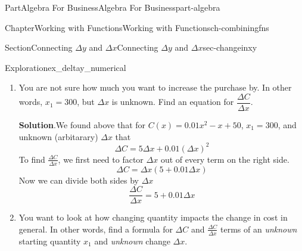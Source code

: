\documentclass{tufte-book}
\newcommand{\blocktitlefont}{\relax}
\numberwithin{equation}{chapter}
\newcommand{\amp}{&}
\begin{document}
\begin{partptx}{Part}{Algebra For Business}{}{Algebra For Business}{}{}{part-algebra}
\begin{chapterptx}{Chapter}{Working with Functions}{}{Working with Functions}{}{}{ch-combiningfns}
\begin{sectionptx}{Section}{\textasteriskcentered{}Connecting \(\Delta y\) and \(\Delta x\)}{}{\textasteriskcentered{}Connecting \(\Delta y\) and \(\Delta x\)}{}{}{sec-changeinxy}
\begin{exploration}{Exploration}{}{ex_deltay_numerical}
\begin{enumerate}[font=\bfseries,label=(\alph*),ref=\alph*]
We can now compute \(C_1\) and \(C_2\)%
\begin{equation*}
C_1 = C(300) = 0.01(300)^2 - 300 + 50 = 650
\end{equation*}
and%
\begin{align*}
C_2 \amp = C\Big(300 + \Delta x\Big)\\
\amp = 0.01\Big(300 + \Delta x\Big)^2 - \Big(300 + \Delta x\Big) + 50 \\
\amp = 0.01\Big(300\cdot 300 + 2\cdot 300\cdot \Delta x + (\Delta x)^2\Big) - \Big(300 + \Delta x\Big) + 50 \\
\amp = 900 + 6\cdot \Delta x + 0.01(\Delta x)^2 - 300 - \Delta x + 50 \\
\amp = 650 + 5\cdot \Delta x + 0.01(\Delta x)^2  
\end{align*}
We have found that%
\begin{align*}
C_1 \amp = 650 \\
C_2 \amp = 650 + 5\cdot \Delta x + 0.01(\Delta x)^2  
\end{align*}
We can now compute%
\begin{align*}
\Delta C \amp = C_2 - C_1 \\
\amp = \Big(650+5\Delta x + 0.01(\Delta x)^2\Big) - \Big(650\Big)\\
\Delta C \amp = 5\Delta x + 0.01(\Delta x)^2 
\end{align*}
%
\item{}You are not sure how much you want to increase the purchase by.  In other words, \(x_1=300\), but \(\Delta x\) is unknown. Find an equation for \(\dfrac{\Delta C}{\Delta x}\).%
\par\smallskip%
\noindent\textbf{\blocktitlefont Solution}.\hypertarget{ex_deltay_numerical-6-2}{}\quad{}We found above that for \(C(x) =  0.01 x^2 - x+ 50\),  \(x_1=300\), and unknown (arbitarary) \(\Delta x\) that%
\begin{equation*}
\Delta C = 5\Delta x + 0.01(\Delta x)^2 
\end{equation*}
To find \(\frac{\Delta C}{\Delta x}\), we first need to factor \(\Delta x\) out of every term on the right side.%
\begin{equation*}
\Delta C = \Delta x(5 + 0.01 \Delta x) 
\end{equation*}
Now we can divide both sides by \(\Delta x\)%
\begin{equation*}
\dfrac{\Delta C}{\Delta x} = 5 + 0.01 \Delta x 
\end{equation*}
%
\item{}You want to look at how changing quantity impacts the change in cost in general.  In other words, find a formula for \(\Delta C\) and \(\frac{\Delta C}{\Delta x}\) terms of an \emph{unknown} starting quantity \(x_1\) and \emph{unknown} change \(\Delta x\).%

\end{enumerate}
\end{exploration}
\end{sectionptx}
\end{chapterptx}
\end{partptx}
\end{document}
